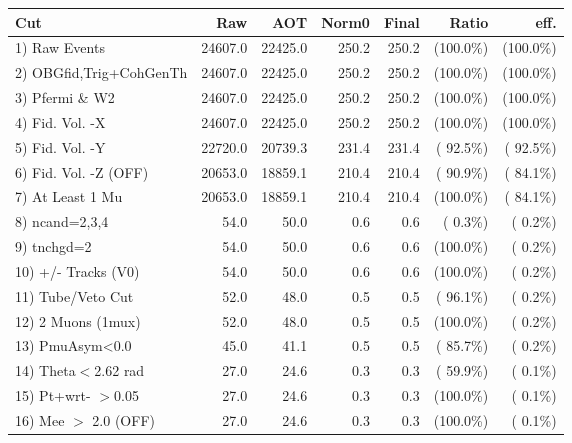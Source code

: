  \begin{table}[h!]\centering
 \begin{tabular}{||l||r|r|r|r|r|r||}
 \hline
 \hline
 Cut & Raw & AOT & Norm0 & Final & Ratio & eff.       \\
 \hline
  1) Raw Events           &      24607.0 &      22425.0 &        250.2 &        250.2 & (100.0\%) & (100.0\%) \\
  2) OBGfid,Trig+CohGenTh &      24607.0 &      22425.0 &        250.2 &        250.2 & (100.0\%) & (100.0\%) \\
  3) Pfermi \& W2         &      24607.0 &      22425.0 &        250.2 &        250.2 & (100.0\%) & (100.0\%) \\
  4) Fid. Vol. -X         &      24607.0 &      22425.0 &        250.2 &        250.2 & (100.0\%) & (100.0\%) \\
  5) Fid. Vol. -Y         &      22720.0 &      20739.3 &        231.4 &        231.4 & ( 92.5\%) & ( 92.5\%) \\
  6) Fid. Vol. -Z (OFF)   &      20653.0 &      18859.1 &        210.4 &        210.4 & ( 90.9\%) & ( 84.1\%) \\
  7) At Least 1 Mu        &      20653.0 &      18859.1 &        210.4 &        210.4 & (100.0\%) & ( 84.1\%) \\
  8) ncand=2,3,4          &         54.0 &         50.0 &          0.6 &          0.6 & (  0.3\%) & (  0.2\%) \\
  9) tnchgd=2             &         54.0 &         50.0 &          0.6 &          0.6 & (100.0\%) & (  0.2\%) \\
 10) +/- Tracks (V0)      &         54.0 &         50.0 &          0.6 &          0.6 & (100.0\%) & (  0.2\%) \\
 11) Tube/Veto Cut        &         52.0 &         48.0 &          0.5 &          0.5 & ( 96.1\%) & (  0.2\%) \\
 12) 2 Muons (1mux)       &         52.0 &         48.0 &          0.5 &          0.5 & (100.0\%) & (  0.2\%) \\
 13) PmuAsym<0.0          &         45.0 &         41.1 &          0.5 &          0.5 & ( 85.7\%) & (  0.2\%) \\
 14) Theta$<$2.62 rad     &         27.0 &         24.6 &          0.3 &          0.3 & ( 59.9\%) & (  0.1\%) \\
 15) Pt+wrt- $>$0.05      &         27.0 &         24.6 &          0.3 &          0.3 & (100.0\%) & (  0.1\%) \\
 16) Mee $>$ 2.0  (OFF)   &         27.0 &         24.6 &          0.3 &          0.3 & (100.0\%) & (  0.1\%) \\

\end{tabular}
\end{table}
